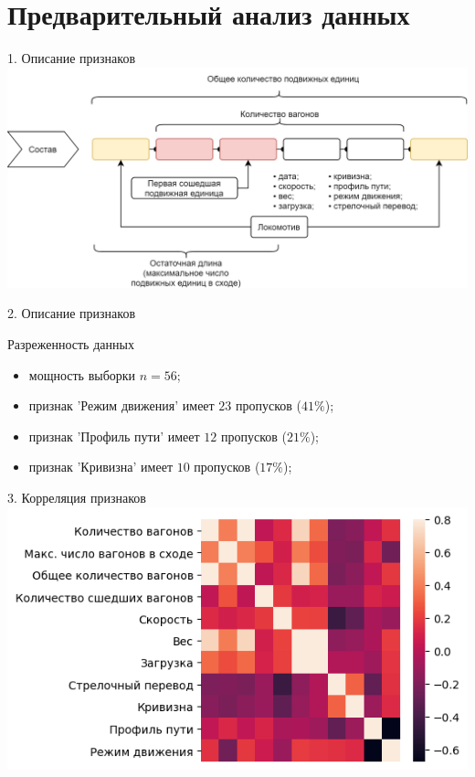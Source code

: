 \documentclass[aspectratio=169]{beamer}
\begin{document}
    \section{Предварительный анализ данных}
    \begin{frame}{1. Описание признаков}
        \centering
        \includegraphics[width=0.8\linewidth]{src/train.png}
    \end{frame}


    \begin{frame}{2. Описание признаков}
        \begin{block}{Разреженность данных}
            \begin{itemize}
                \item мощность выборки $n = 56$;
                \item признак 'Режим движения' имеет $23$ пропусков ($41\%$);
                \item признак 'Профиль пути' имеет $12$ пропусков ($21\%$);
                \item признак 'Кривизна' имеет $10$ пропусков ($17\%$);
            \end{itemize}
        \end{block}
    \end{frame}


    \begin{frame}{3. Корреляция признаков}
        \centering
        \includegraphics[width=1.3\textheight]{src/corr_plot.png}
    \end{frame}
\end{document}
